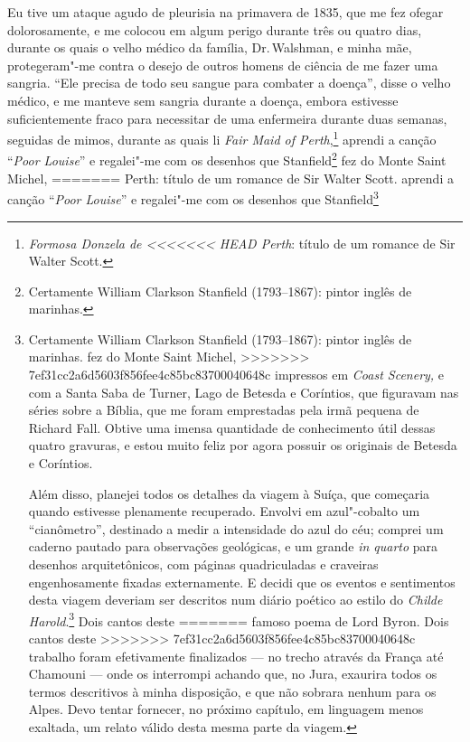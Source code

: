 {{{{{{{{{{{{{{{{{{{{{{{{{{{{{{{{{{{{{{{{{{{{{{{{{{{{{{{{{{{{{{{{%
Eu tive um ataque agudo de pleurisia na primavera de 1835, que me
fez ofegar dolorosamente, e me colocou em algum perigo durante três ou
quatro dias, durante os quais o velho médico da família, Dr.\,Walshman, e
minha mãe, protegeram"-me contra o desejo de outros homens de ciência de
me fazer uma sangria. ``Ele precisa de todo seu sangue para combater a
doença'', disse o velho médico, e me manteve sem sangria durante a
doença, embora estivesse suficientemente fraco para necessitar de uma
enfermeira durante duas semanas, seguidas de mimos, durante as quais li
\textit{Fair Maid of Perth},\footnote{\textit{Formosa Donzela de
<<<<<<< HEAD
  Perth}: título de um romance de Sir Walter Scott.}
aprendi a canção ``\textit{Poor Louise}'' e regalei"-me com os desenhos que
Stanfield\footnote{Certamente William Clarkson Stanfield (1793--1867):
  pintor inglês de marinhas.} fez do Monte Saint Michel,
=======
  Perth}: título de um romance de Sir Walter Scott. 
aprendi a canção ``\textit{Poor Louise}'' e regalei"-me com os desenhos que
Stanfield\footnote{Certamente William Clarkson Stanfield (1793--1867):
  pintor inglês de marinhas.  fez do Monte Saint Michel,
>>>>>>> 7ef31cc2a6d5603f856fee4c85bc83700040648c
impressos em \textit{Coast Scenery,} e com a Santa Saba de Turner, Lago de
Betesda e Coríntios, que figuravam nas séries sobre a Bíblia, que me
foram emprestadas pela irmã pequena de Richard Fall. Obtive uma imensa
quantidade de conhecimento útil dessas quatro gravuras, e estou muito
feliz por agora possuir os originais de Betesda e Coríntios.

Além disso, planejei todos os detalhes da viagem à Suíça, que começaria
quando estivesse plenamente recuperado. Envolvi em azul"-cobalto um \label{176}
``cianômetro'', destinado a medir a intensidade do azul do céu; comprei
um caderno pautado para observações geológicas, e um grande \textit{in
quarto} para desenhos arquitetônicos, com páginas quadriculadas e
craveiras engenhosamente fixadas externamente. E decidi que os eventos e
sentimentos desta viagem deveriam ser descritos num diário poético ao
estilo do \textit{Childe Harold}.\footnote{\textit{Childe Harold's
  Pilgrimage} (\textit{A Peregrinação de Childe Harold}): título de um
<<<<<<< HEAD
  famoso poema de Lord Byron.} Dois cantos deste
=======
  famoso poema de Lord Byron.  Dois cantos deste
>>>>>>> 7ef31cc2a6d5603f856fee4c85bc83700040648c
trabalho foram efetivamente finalizados --- no trecho através da França
até Chamouni --- onde os interrompi achando que, no Jura, exaurira todos
os termos descritivos à minha disposição, e que não sobrara nenhum para
os Alpes. Devo tentar fornecer, no próximo capítulo, em linguagem menos
exaltada, um relato válido desta mesma parte da viagem.

}}}}}}}}}}}}}}}}}}}}}}}}}}}}}}}}}}}}}}}}}}}}}}}}}}}}}}}}}}}}}}}}
